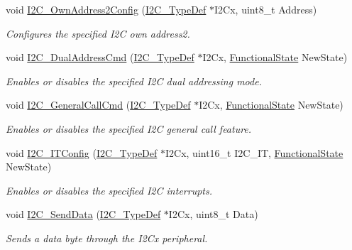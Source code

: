 \begin{DoxyCompactItemize}
void \hyperlink{group___i2_c___exported___functions_ga7be2cc634a613c8e3539137e897a22df}{I2\+C\+\_\+\+Own\+Address2\+Config} (\hyperlink{struct_i2_c___type_def}{I2\+C\+\_\+\+Type\+Def} $\ast$I2\+Cx, uint8\+\_\+t Address)
\begin{DoxyCompactList}\small\item\em Configures the specified I2C own address2. \end{DoxyCompactList}\item 
void \hyperlink{group___i2_c___exported___functions_ga02145a333a56e79557d6ef4ea03fc313}{I2\+C\+\_\+\+Dual\+Address\+Cmd} (\hyperlink{struct_i2_c___type_def}{I2\+C\+\_\+\+Type\+Def} $\ast$I2\+Cx, \hyperlink{group___exported__types_gac9a7e9a35d2513ec15c3b537aaa4fba1}{Functional\+State} New\+State)
\begin{DoxyCompactList}\small\item\em Enables or disables the specified I2C dual addressing mode. \end{DoxyCompactList}\item 
void \hyperlink{group___i2_c___exported___functions_ga65c740fc8d7b3b9f15cc432d8699d471}{I2\+C\+\_\+\+General\+Call\+Cmd} (\hyperlink{struct_i2_c___type_def}{I2\+C\+\_\+\+Type\+Def} $\ast$I2\+Cx, \hyperlink{group___exported__types_gac9a7e9a35d2513ec15c3b537aaa4fba1}{Functional\+State} New\+State)
\begin{DoxyCompactList}\small\item\em Enables or disables the specified I2C general call feature. \end{DoxyCompactList}\item 
void \hyperlink{group___i2_c___exported___functions_ga58fed146a06cb81d2940604e460de047}{I2\+C\+\_\+\+I\+T\+Config} (\hyperlink{struct_i2_c___type_def}{I2\+C\+\_\+\+Type\+Def} $\ast$I2\+Cx, uint16\+\_\+t I2\+C\+\_\+\+IT, \hyperlink{group___exported__types_gac9a7e9a35d2513ec15c3b537aaa4fba1}{Functional\+State} New\+State)
\begin{DoxyCompactList}\small\item\em Enables or disables the specified I2C interrupts. \end{DoxyCompactList}\item 
void \hyperlink{group___i2_c___exported___functions_ga7bd9e70b8eafde0dd5eb42b0d95fe1a9}{I2\+C\+\_\+\+Send\+Data} (\hyperlink{struct_i2_c___type_def}{I2\+C\+\_\+\+Type\+Def} $\ast$I2\+Cx, uint8\+\_\+t Data)
\begin{DoxyCompactList}\small\item\em Sends a data byte through the I2\+Cx peripheral. \end{DoxyCompactList}\item 

\end{DoxyCompactItemize}
